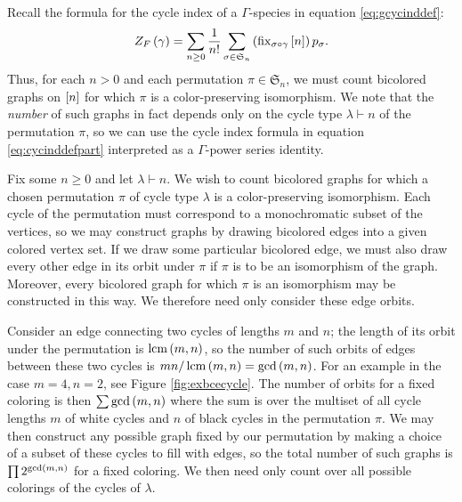 \documentclass[sectionflow,singlespace,twoside]{brandiss} %
\numberwithin{section}{chapter}
\numberwithin{figure}{chapter}
\begin{document}
Recall the formula for the cycle index of a $\Gamma$-species in equation \eqref{eq:gcycinddef}:
\begin{equation*}
  Z_{F} \left( {\gamma} \right) = \sum_{n \geq 0} \frac{1}{n!} \sum_{\sigma \in \mathfrak{S}_{n}} \left( {\operatorname{fix}_{\sigma \circ \gamma} \left[ {n} \right]} \right) p_{\sigma}.
\end{equation*}
Thus, for each $n > 0$ and each permutation $\pi \in \mathfrak{S}_{n}$, we must count bicolored graphs on $\left[ {n} \right]$ for which $\pi$ is a color-preserving isomorphism.
We note that the \emph{number} of such graphs in fact depends only on the cycle type $\lambda \vdash n$ of the permutation $\pi$, so we can use the cycle index formula in equation \eqref{eq:cycinddefpart} interpreted as a $\Gamma$-power series identity.

Fix some $n \geq 0$ and let $\lambda \vdash n$.
We wish to count bicolored graphs for which a chosen permutation $\pi$ of cycle type $\lambda$ is a color-preserving isomorphism.
Each cycle of the permutation must correspond to a monochromatic subset of the vertices, so we may construct graphs by drawing bicolored edges into a given colored vertex set.
If we draw some particular bicolored edge, we must also draw every other edge in its orbit under $\pi$ if $\pi$ is to be an isomorphism of the graph.
Moreover, every bicolored graph for which $\pi$ is an isomorphism may be constructed in this way.
We therefore need only consider these edge orbits.

Consider an edge connecting two cycles of lengths $m$ and $n$; the length of its orbit under the permutation is $\operatorname{lcm} \left( {m, n} \right)$, so the number of such orbits of edges between these two cycles is $mn / \operatorname{lcm} \left( {m, n} \right) = \gcd \left( {m, n} \right)$.
For an example in the case $m = 4, n = 2$, see Figure \ref{fig:exbcecycle}.
The number of orbits for a fixed coloring is then $\sum \gcd \left( {m, n} \right)$ where the sum is over the multiset of all cycle lengths $m$ of white cycles and $n$ of black cycles in the permutation $\pi$.
We may then construct any possible graph fixed by our permutation by making a choice of a subset of these cycles to fill with edges, so the total number of such graphs is $\prod 2^{\gcd \left( {m, n} \right)}$ for a fixed coloring.
We then need only count over all possible colorings of the cycles of $\lambda$.
\end{document}
